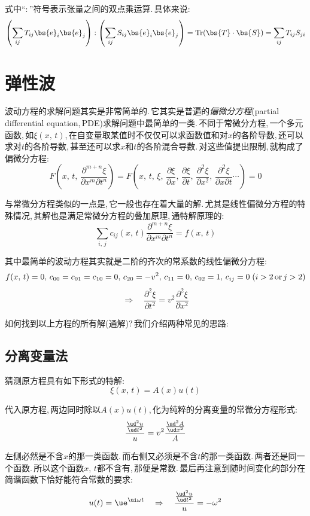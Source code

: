 式中``$:$''符号表示张量之间的双点乘运算.\,具体来说:
\[\left(\sum_{ij}T_{ij}\bs{e}_i\bs{e}_j\right):\left(\sum_{ij}S_{ij}\bs{e}_i\bs{e}_j\right)={\rm Tr}(\bs{T}\cdot\bs{S})=\sum_{ij}T_{ij}S_{ji}\]

\section{弹性波}

波动方程的求解问题其实是非常简单的.\,它其实是普遍的\emph{偏微分方程}(partial differential equation,\,PDE)求解问题中最简单的一类.\,不同于常微分方程,\,一个多元函数,\,如$\xi(x,\,t)$,\,在自变量取某值时不仅仅可以求函数值和对$x$的各阶导数,\,还可以求对$t$的各阶导数,\,甚至还可以求$x$和$t$的各阶混合导数.\,对这些值提出限制,\,就构成了偏微分方程:
\[F\left(x,\,t,\,\frac{\partial^{m+n}\xi}{\partial x^m\partial t^n}\right)=F\left(x,\,t,\,\xi,\,\frac{\partial\xi}{\partial x},\,\frac{\partial\xi}{\partial t},\,\frac{\partial^2\xi}{\partial x^2},\,\frac{\partial^2\xi}{\partial x\partial t}\cdots\right)=0\]

与常微分方程类似的一点是,\,它一般也存在着大量的解.\,尤其是线性偏微分方程的特殊情况,\,其解也是满足常微分方程的叠加原理,\,通特解原理的:
\[\sum_{i,\,j}c_{ij}(x,\,t)\frac{\partial^{m+n}\xi}{\partial x^m\partial t^n}=f(x,\,t)\]

其中最简单的波动方程其实就是二阶的齐次的常系数的线性偏微分方程:
\[f(x,\,t)=0,\,c_{00}=c_{01}=c_{10}=0,\,c_{20}=-v^2,\,c_{11}=0,\,c_{02}=1,\,c_{ij}=0\;(i>2\,{\rm or}\,j>2)\]
\[\Rightarrow\quad \frac{\partial^2 \xi}{\partial t^2}=v^2 \frac{\partial^2 \xi}{\partial x^2}\]

如何找到以上方程的所有解(通解)?\,我们介绍两种常见的思路:

\subsection{分离变量法}

猜测原方程具有如下形式的特解:
\[\xi(x,\,t)=A(x)u(t)\]

代入原方程,\,两边同时除以$A(x)u(t)$,\,化为纯粹的分离变量的常微分方程形式:
\[\frac{\frac{\ud^2 u}{\ud t^2}}{u}=v^2\frac{\frac{\ud^2 A}{\ud x^2}}{A}\]

左侧必然是不含$x$的那一类函数.\,而右侧又必须是不含$t$的那一类函数.\,两者还是同一个函数.\,所以这个函数$x,\,t$都不含有,\,那便是常数.\,最后再注意到随时间变化的部分在简谐函数下恰好能符合常数的要求:
\[u(t)=\ue^{\ui\omega t}\quad \Rightarrow\quad \frac{\frac{\ud^2 u}{\ud t^2}}{u}=-\omega^2\]

